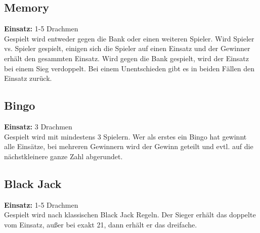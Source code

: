 \documentclass[11pt]{scrartcl}
\begin{document}
\subsection{Memory}
\textbf{Einsatz:} 1-5 Drachmen\\Gespielt wird entweder gegen die Bank oder einen weiteren Spieler. Wird Spieler vs. Spieler gespielt, einigen sich die Spieler auf einen Einsatz und der Gewinner erhält den gesammten Einsatz. Wird gegen die Bank gespielt, wird der Einsatz bei einem Sieg verdoppelt. Bei einem Unentschieden gibt es in beiden Fällen den Einsatz zurück.
\subsection{Bingo}
\textbf{Einsatz:} 3 Drachmen\\Gespielt wird mit mindestens 3 Spielern. Wer als erstes ein Bingo hat gewinnt alle Einsätze, bei mehreren Gewinnern wird der Gewinn geteilt und evtl. auf die nächstkleinere ganze Zahl abgerundet.
\subsection{Black Jack}
\textbf{Einsatz:} 1-5 Drachmen\\Gespielt wird nach klassischen Black Jack Regeln. Der Sieger erhält das doppelte vom Einsatz, außer bei exakt 21, dann erhält er das dreifache.
\end{document}

